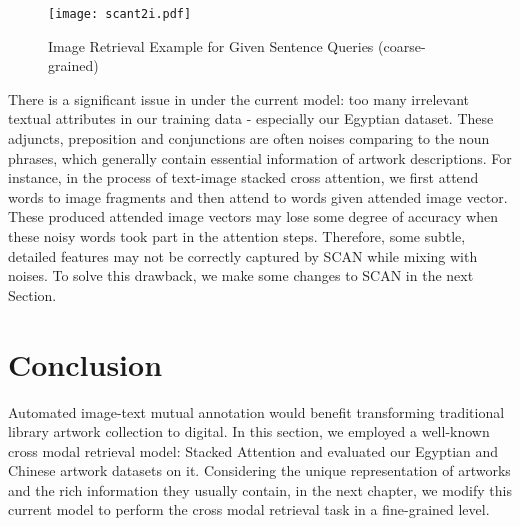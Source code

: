 \begin{figure}[h!]
\centering
\texttt{[image: scant2i.pdf]}
\caption{Image Retrieval Example for Given Sentence Queries (coarse-grained)}
\label{fig:scant2i}
\end{figure}

There is a significant issue in under the current model: too many irrelevant textual attributes in our training data - especially our Egyptian dataset. These adjuncts, preposition and conjunctions are often noises comparing to the noun phrases, which generally contain essential information of artwork descriptions. For instance, in the process of text-image stacked cross attention, we first attend words to image fragments and then attend to words given attended image vector. These produced attended image vectors may lose some degree of accuracy when these noisy words took part in the attention steps. Therefore, some subtle, detailed features may not be correctly captured by SCAN while mixing with noises. To solve this drawback, we make some changes to SCAN in the next Section.


\section{Conclusion}
Automated image-text mutual annotation would benefit transforming traditional library artwork collection to digital. In this section, we employed a well-known cross modal retrieval model: Stacked Attention and evaluated our Egyptian and Chinese artwork datasets on it. Considering the unique representation of artworks and the rich information they usually contain, in the next chapter, we modify this current model to perform the cross modal retrieval task in a fine-grained level.


